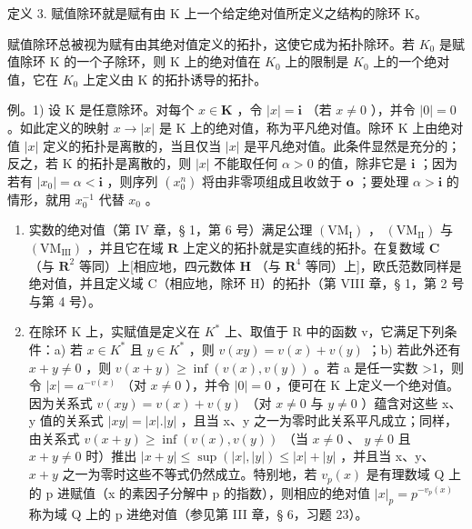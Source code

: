 定义 3. 赋值除环就是赋有由 K 上一个给定绝对值所定义之结构的除环 K。

赋值除环总被视为赋有由其绝对值定义的拓扑，这使它成为拓扑除环。若 \(K_{0}\) 是赋值除环 K 的一个子除环，则 K 上的绝对值在 \(K_{0}\) 上的限制是 \(K_{0}\) 上的一个绝对值，它在 \(K_{0}\) 上定义由 K 的拓扑诱导的拓扑。

例。1) 设 K 是任意除环。对每个 \(x \in \mathbf{K}\) ，令 \(|x| = \mathbf{i}\) （若 \(x \neq 0\) ），并令 \(|0| = 0\) 。如此定义的映射 \(x \to |x|\) 是 K 上的绝对值，称为平凡绝对值。除环 K 上由绝对值 \(|x|\) 定义的拓扑是离散的，当且仅当 \(|x|\) 是平凡绝对值。此条件显然是充分的；反之，若 K 的拓扑是离散的，则 \(|x|\) 不能取任何 \(\alpha > 0\) 的值，除非它是 \(\mathbf{i}\) ；因为若有 \(|x_0| = \alpha < \mathbf{i}\) ，则序列 \((x_0^n)\) 将由非零项组成且收敛于 \(\mathbf{o}\) ；要处理 \(\alpha > \mathbf{i}\) 的情形，就用 \(x_0^{-1}\) 代替 \(x_0\) 。

\begin{enumerate}
\def\labelenumi{\arabic{enumi})}
\setcounter{enumi}{1}
\item
  实数的绝对值（第 IV 章，§ 1，第 6 号）满足公理 \((\mathrm{VM}_{\mathrm{I}})\) ， \((\mathrm{VM}_{\mathrm{II}})\) 与 \((\mathrm{VM}_{\mathrm{III}})\) ，并且它在域 \(\mathbf{R}\) 上定义的拓扑就是实直线的拓扑。在复数域 \(\mathbf{C}\) （与 \(\mathbf{R}^2\) 等同）上{[}相应地，四元数体 \(\mathbf{H}\) （与 \(\mathbf{R}^4\) 等同）上{]}，欧氏范数同样是绝对值，并且定义域 C（相应地，除环 H）的拓扑（第 VIII 章，§ 1，第 2 号与第 4 号）。
\item
  在除环 K 上，实赋值是定义在 \(K^{*}\) 上、取值于 R 中的函数 v，它满足下列条件：a) 若 \(x \in K^{*}\) 且 \(y \in K^{*}\) ，则 \(v(xy) = v(x) + v(y)\) ；b) 若此外还有 \(x + y \neq 0\) ，则 \(v(x + y) \geqslant \inf(v(x), v(y))\) 。若 a 是任一实数 \textgreater1，则令 \(|x| = a^{-v(x)}\) （对 \(x \neq 0\) ），并令 \(|0| = 0\) ，便可在 K 上定义一个绝对值。因为关系式 \(v(xy) = v(x) + v(y)\) （对 \(x \neq 0\) 与 \(y \neq 0\) ）蕴含对这些 x、y 值的关系式 \(|xy| = |x|.|y|\) ，且当 x、y 之一为零时此关系平凡成立；同样，由关系式 \(v(x + y) \geqslant \inf(v(x), v(y))\) （当 \(x \neq 0\) 、 \(y \neq 0\) 且 \(x + y \neq 0\) 时）推出 \(|x + y| \leqslant \sup(|x|, |y|) \leqslant |x| + |y|\) ，并且当 x、y、 \(x + y\) 之一为零时这些不等式仍然成立。特别地，若 \(v_{p}(x)\) 是有理数域 Q 上的 p 进赋值（x 的素因子分解中 p 的指数），则相应的绝对值 \(|x|_{p} = p^{-v_{p}(x)}\) 称为域 Q 上的 p 进绝对值（参见第 III 章，§ 6，习题 23）。
\end{enumerate}

